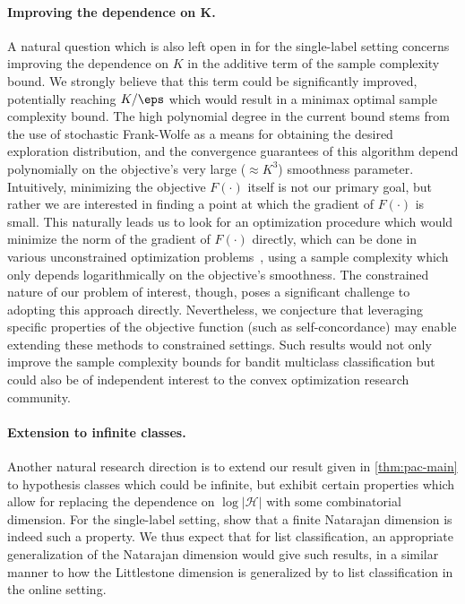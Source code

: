 \documentclass[11pt]{article}
\newcommand{\calH}{\mathcal{H}}
\newcommand{\obj}{F}
\theoremstyle{plain}
\begin{document}
\paragraph{Improving the dependence on $\boldsymbol{K}$.} A natural question which is also left open in \cite{erez2024fast} for the single-label setting concerns improving the dependence on $K$ in the additive term of the sample complexity bound. We strongly believe that this term could be significantly improved, potentially reaching $K / \eps$ which would result in a minimax optimal sample complexity bound. The high polynomial degree in the current bound stems from the use of stochastic Frank-Wolfe as a means for obtaining the desired exploration distribution, and the convergence guarantees of this algorithm depend polynomially on the objective's very large ($\approx\! K^3$) smoothness parameter. Intuitively, minimizing the objective $\obj(\cdot)$ itself is not our primary goal, but rather we are interested in finding a point at which the gradient of $\obj(\cdot)$ is small. This naturally leads us to look for an optimization procedure which would minimize the norm of the gradient of $F(\cdot)$ directly, which can be done in various unconstrained optimization problems~\citep[see, e.g.,][]{foster2019complexity}, using a sample complexity which only depends logarithmically on the objective's smoothness. The constrained nature of our problem of interest, though, poses a significant challenge to adopting this approach directly. Nevertheless, we conjecture that leveraging specific properties of the objective function (such as self-concordance) may enable extending these methods to constrained settings. Such results would not only improve the sample complexity bounds for bandit multiclass classification but could also be of independent interest to the convex optimization research community. 

\paragraph{Extension to infinite classes.} Another natural research direction is to extend our result given in \cref{thm:pac-main} to hypothesis classes which could be infinite, but exhibit certain properties which allow for replacing the dependence on $\log |\calH|$ with some combinatorial dimension. For the single-label setting, \cite{erez2024fast} show that a finite Natarajan dimension is indeed such a property. We thus expect that for list classification, an appropriate generalization of the Natarajan dimension would give such results, in a similar manner to how the Littlestone dimension is generalized by \cite{moran2023list} to list classification in the online setting.
\end{document}
